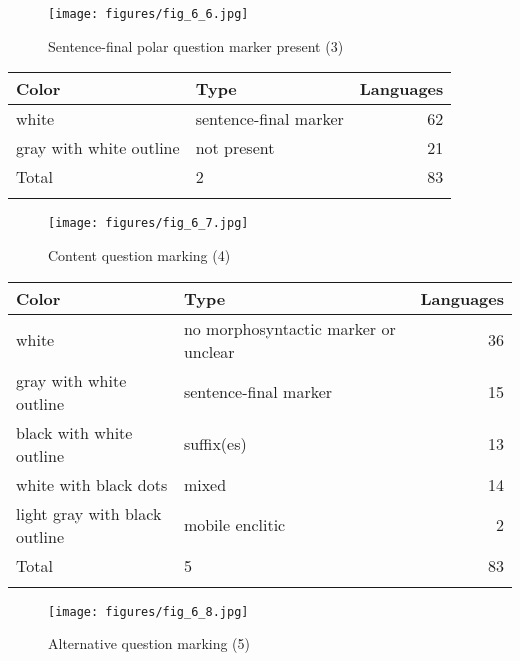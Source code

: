\clearpage %
\begin{figure}
\texttt{[image: figures/fig\_6\_6.jpg]}
\caption{Sentence-final polar question marker present (3)}
\label{fig:6:6}
\end{figure}

\begin{table}
\begin{tabularx}{\textwidth}{lQr}
\lsptoprule

\textbf{Color} & \textbf{Type} & \textbf{Languages}\\
\midrule
white & sentence-final marker & 62\\
gray with white outline & not present & 21\\
\midrule Total & 2 & 83\\
\lspbottomrule
\end{tabularx} 
\end{table}

\clearpage %
\begin{figure}
\texttt{[image: figures/fig\_6\_7.jpg]}
\caption{Content question marking (4)}
\label{fig:6:7}
\end{figure}

\begin{table}
\begin{tabularx}{\textwidth}{lQr}
\lsptoprule

\textbf{Color} & \textbf{Type} & \textbf{Languages}\\
\midrule
white & no morphosyntactic marker or unclear & 36\\
gray with white outline & sentence-final marker & 15\\
black with white outline & suffix(es) & 13\\
white with black dots & mixed & 14\\
light gray with black outline & mobile enclitic & 2\\
\midrule Total & 5 & 83\\
\lspbottomrule
\end{tabularx}
\end{table}

\clearpage %
\begin{figure}
\texttt{[image: figures/fig\_6\_8.jpg]}
\caption{Alternative question marking (5)}
\label{fig:6:8}
\end{figure}

